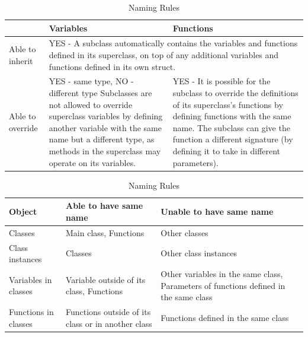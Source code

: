 \documentclass[11pt,a4paper]{article}
\begin{document}
\begin{table}
    \label{sec:table1}
    \begin{center}
      \begin{tabular}{|| m{10em} | m{15em} | m{15em} ||} 
      \hline
        & Variables & Functions \\
      \hline
      Able to inherit & \multicolumn{2}{C{30em}||}{YES - 
      A subclass automatically contains the variables and functions defined in its superclass, on top of any additional variables and functions defined in its own struct. 
      }\\
      \hline
      Able to override & YES - same type, NO - different type
      Subclasses are not allowed to override superclass variables by defining another variable with the same name but a different type, as methods in the superclass may operate on its variables.
      &
      YES - 
    It is possible for the subclass to override the definitions of its superclass’s functions by defining functions with the same name. The subclass can give the function a different signature (by defining it to take in different parameters).  \\
    \hline
      \end{tabular}
      \caption{Inheritance Rules}
    \end{center}

    \begin{center}
        \label{sec:table23}
        \begin{tabular}{|| m{10em} | m{15em} | m{15em} ||} 
        \hline
        Object & Able to have same name & Unable to have same name \\
        \hline
        Classes & Main class, Functions & Other classes \\
        \hline
        Class instances & Classes & Other class instances \\
        \hline
        Variables in classes & Variable outside of its class, Functions & Other variables in the same class, Parameters of functions defined in the same class \\
        \hline
        Functions in classes & Functions outside of its class or in another class & Functions defined in the same class \\
        \hline
        \end{tabular}
        \caption{Naming Rules}
    \end{center}


\end{table}
\end{document}
